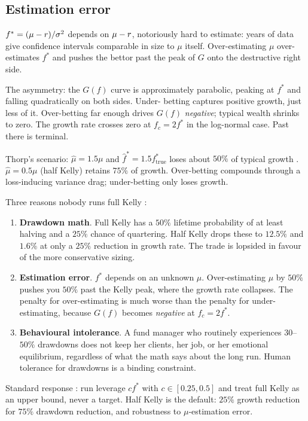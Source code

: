 \subsection{Estimation error}
\label{sec:kelly_estimation_error}

$f^{*} = (\mu - r)/\sigma^2$ depends on $\mu - r$, notoriously
hard to estimate: years of data give confidence intervals
comparable in size to $\mu$ itself. Over-estimating $\mu$
over-estimates $f^{*}$ and pushes the bettor past the peak of $G$
onto the destructive right side.

The asymmetry: the $G(f)$ curve is approximately parabolic,
peaking at $f^{*}$ and falling quadratically on both sides. Under-
betting captures positive growth, just less of it. Over-betting
far enough drives $G(f)$ \emph{negative}; typical wealth shrinks
to zero. The growth rate crosses zero at $f_c = 2f^{*}$ in the
log-normal case. Past there is terminal.

Thorp's scenario: $\hat\mu = 1.5\mu$ and $\hat f^{*} = 1.5
f^{*}_{\text{true}}$ loses about $50\%$ of typical growth
\citeThorp. $\hat\mu = 0.5\mu$ (half Kelly) retains $75\%$ of
growth. Over-betting compounds through a loss-inducing variance
drag; under-betting only loses growth.

\begin{pitfallbox}
Three reasons nobody runs full Kelly \citeThorp:
\begin{enumerate}
  \item \textbf{Drawdown math}. Full Kelly has a $50\%$ lifetime
  probability of at least halving and a $25\%$ chance of
  quartering. Half Kelly drops these to $12.5\%$ and $1.6\%$ at
  only a $25\%$ reduction in growth rate. The trade is lopsided in
  favour of the more conservative sizing.
  \item \textbf{Estimation error}. $f^{*}$ depends on an unknown
  $\mu$. Over-estimating $\mu$ by $50\%$ pushes you $50\%$ past
  the Kelly peak, where the growth rate collapses. The penalty
  for over-estimating is much worse than the penalty for
  under-estimating, because $G(f)$ becomes \emph{negative} at
  $f_c = 2 f^{*}$.
  \item \textbf{Behavioural intolerance}. A fund manager who
  routinely experiences $30$--$50\%$ drawdowns does not keep
  her clients, her job, or her emotional equilibrium, regardless
  of what the math says about the long run. Human tolerance for
  drawdowns is a binding constraint.
\end{enumerate}
Standard response \citeThorp: run leverage $c f^{*}$ with $c \in
[0.25, 0.5]$ and treat full Kelly as an upper bound, never a
target. Half Kelly is the default: $25\%$ growth reduction for
$75\%$ drawdown reduction, and robustness to $\mu$-estimation
error.
\end{pitfallbox}

